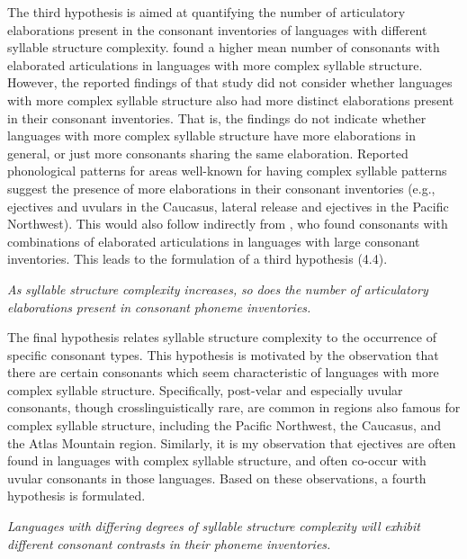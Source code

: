   The third hypothesis is aimed at quantifying the number of articulatory elaborations present in the consonant inventories of languages with different syllable structure complexity. \citet{MaddiesonEtAl2013} found a higher mean number of consonants with elaborated articulations in languages with more complex syllable structure. However, the reported findings of that study did not consider whether languages with more complex syllable structure also had more distinct elaborations present in their consonant inventories. That is, the findings do not indicate whether languages with more complex syllable structure have more elaborations in general, or just more consonants sharing the same elaboration. Reported phonological patterns for areas well-known for having complex syllable patterns suggest the presence of more elaborations in their consonant inventories (e.g., ejectives and uvulars in the Caucasus, lateral release and ejectives in the Pacific Northwest). This would also follow indirectly from \citet{LindblomMaddieson1988}, who found consonants with combinations of elaborated articulations in languages with large consonant inventories. This leads to the formulation of a third hypothesis (4.4).

\ea\label{ex:(4.4)}
  \textit{As} \textit{syllable} \textit{structure} \textit{complexity} \textit{increases,} \textit{so} \textit{does} \textit{the} \textit{number} \textit{of} \textit{articulatory} \textit{elaborations} \textit{present} \textit{in} \textit{consonant} \textit{phoneme} \textit{inventories.}
\z

  The final hypothesis relates syllable structure complexity to the occurrence of specific consonant types. This hypothesis is motivated by the observation that there are certain consonants which seem characteristic of languages with more complex syllable structure. Specifically, post-velar and especially uvular consonants, though crosslinguistically rare, are common in regions also famous for complex syllable structure, including the Pacific Northwest, the Caucasus, and the Atlas Mountain region. Similarly, it is my observation that ejectives are often found in languages with complex syllable structure, and often co-occur with uvular consonants in those languages. Based on these observations, a fourth hypothesis is formulated.

\ea\label{ex:(4.5)}
  \textit{Languages} \textit{with} \textit{differing} \textit{degrees} \textit{of} \textit{syllable} \textit{structure} \textit{complexity} \textit{will} \textit{exhibit} \textit{different} \textit{consonant} \textit{contrasts} \textit{in} \textit{their} \textit{phoneme} \textit{inventories.}
\z

